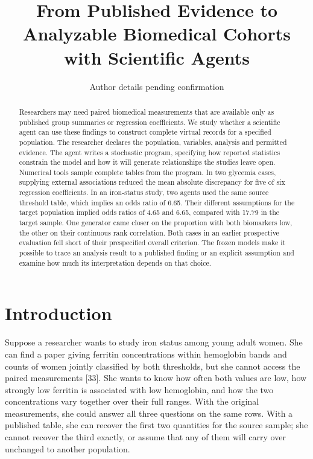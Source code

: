\documentclass[sigconf,review]{acmart}
\begin{document}
\title{From Published Evidence to Analyzable Biomedical Cohorts with Scientific Agents}
\author{Author details pending confirmation}
\begin{abstract}

Researchers may need paired biomedical measurements that are available only as published group summaries or regression coefficients. We study whether a scientific agent can use these findings to construct complete virtual records for a specified population. The researcher declares the population, variables, analysis and permitted evidence. The agent writes a stochastic program, specifying how reported statistics constrain the model and how it will generate relationships the studies leave open. Numerical tools sample complete tables from the program. In two glycemia cases, supplying external associations reduced the mean absolute discrepancy for five of six regression coefficients. In an iron-status study, two agents used the same source threshold table, which implies an odds ratio of 6.65. Their different assumptions for the target population implied odds ratios of 4.65 and 6.65, compared with 17.79 in the target sample. One generator came closer on the proportion with both biomarkers low, the other on their continuous rank correlation. Both cases in an earlier prospective evaluation fell short of their prespecified overall criterion. The frozen models make it possible to trace an analysis result to a published finding or an explicit assumption and examine how much its interpretation depends on that choice.

\end{abstract}

\maketitle

\section{Introduction}

Suppose a researcher wants to study iron status among young adult women. She can find a paper giving ferritin concentrations within hemoglobin bands and counts of women jointly classified by both thresholds, but she cannot access the paired measurements [33]. She wants to know how often both values are low, how strongly low ferritin is associated with low hemoglobin, and how the two concentrations vary together over their full ranges. With the original measurements, she could answer all three questions on the same rows. With a published table, she can recover the first two quantities for the source sample; she cannot recover the third exactly, or assume that any of them will carry over unchanged to another population.
\end{document}
